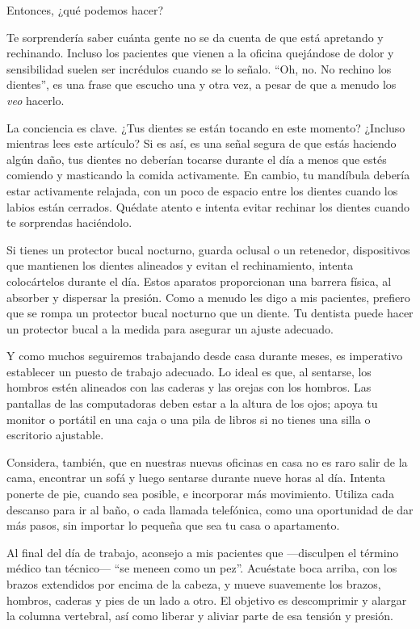 Entonces, ¿qué podemos hacer?

Te sorprendería saber cuánta gente no se da cuenta de que está apretando
y rechinando. Incluso los pacientes que vienen a la oficina quejándose
de dolor y sensibilidad suelen ser incrédulos cuando se lo señalo. ``Oh,
no. No rechino los dientes'', es una frase que escucho una y otra vez, a
pesar de que a menudo los \emph{veo} hacerlo.

La conciencia es clave. ¿Tus dientes se están tocando en este momento?
¿Incluso mientras lees este artículo? Si es así, es una señal segura de
que estás haciendo algún daño, tus dientes no deberían tocarse durante
el día a menos que estés comiendo y masticando la comida activamente. En
cambio, tu mandíbula debería estar activamente relajada, con un poco de
espacio entre los dientes cuando los labios están cerrados. Quédate
atento e intenta evitar rechinar los dientes cuando te sorprendas
haciéndolo.

Si tienes un protector bucal nocturno, guarda oclusal o un retenedor,
dispositivos que mantienen los dientes alineados y evitan el
rechinamiento, intenta colocártelos durante el día. Estos aparatos
proporcionan una barrera física, al absorber y dispersar la presión.
Como a menudo les digo a mis pacientes, prefiero que se rompa un
protector bucal nocturno que un diente. Tu dentista puede hacer un
protector bucal a la medida para asegurar un ajuste adecuado.

Y como muchos seguiremos trabajando desde casa durante meses, es
imperativo establecer un puesto de trabajo adecuado. Lo ideal es que, al
sentarse, los hombros estén alineados con las caderas y las orejas con
los hombros. Las pantallas de las computadoras deben estar a la altura
de los ojos; apoya tu monitor o portátil en una caja o una pila de
libros si no tienes una silla o escritorio ajustable.

Considera, también, que en nuestras nuevas oficinas en casa no es raro
salir de la cama, encontrar un sofá y luego sentarse durante nueve horas
al día. Intenta ponerte de pie, cuando sea posible, e incorporar más
movimiento. Utiliza cada descanso para ir al baño, o cada llamada
telefónica, como una oportunidad de dar más pasos, sin importar lo
pequeña que sea tu casa o apartamento.

Al final del día de trabajo, aconsejo a mis pacientes que ---disculpen
el término médico tan técnico--- ``se meneen como un pez''. Acuéstate
boca arriba, con los brazos extendidos por encima de la cabeza, y mueve
suavemente los brazos, hombros, caderas y pies de un lado a otro. El
objetivo es descomprimir y alargar la columna vertebral, así como
liberar y aliviar parte de esa tensión y presión.

